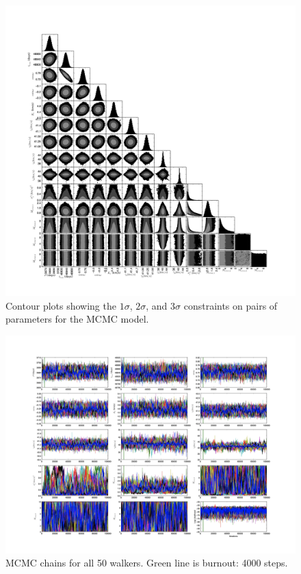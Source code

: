 \documentclass{article}
\begin{document}
\begin{figure}[!htb]
\centering
\includegraphics[width=\textwidth]{corner_100000_errorMult.jpg}
\caption{Contour plots showing the $1 \sigma$, $2 \sigma$, and $3 \sigma$ constraints on pairs of parameters for the MCMC model.}
\end{figure}


\begin{figure}[!htb]
\centering
\includegraphics[width=\textwidth]{chainPlot_100000_errorMult.jpg}
\caption{MCMC chains for all 50 walkers. Green line is burnout: 4000 steps.}
\end{figure}
\end{document}
